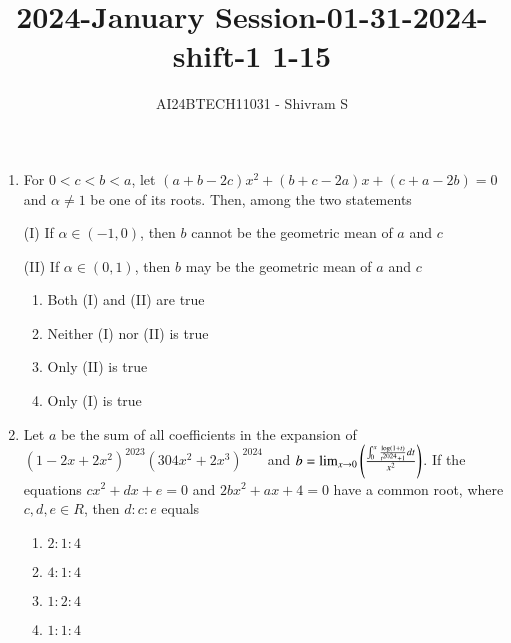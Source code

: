 \documentclass[journal]{IEEEtran}
\begin{document}

\onecolumn

\title{2024-January Session-01-31-2024-shift-1 1-15}
\author{AI24BTECH11031 - Shivram S}
\maketitle
\bigskip

\renewcommand{\thefigure}{\theenumi}
\renewcommand{\thetable}{\theenumi}

\begin{enumerate}


    
    \item For $0 < c < b < a$, let $(a + b - 2c)x^2 + (b + c - 2a)x
    + (c + a - 2b) = 0$ and $\alpha \ne 1$ be one of its roots.
    Then, among the two statements
    
    (I) If $\alpha \in (-1, 0)$, then $b$ cannot be the geometric
    mean of $a$ and $c$
    
    (II) If $\alpha \in (0, 1)$, then $b$ may be the geometric
    mean of $a$ and $c$

    \begin{multicols}{2}
\begin{enumerate}

        \item Both (I) and (II) are true
        \item Neither (I) nor (II) is true
        \item Only (II) is true
        \item Only (I) is true
    \end{enumerate}
\end{multicols}

    \item Let $a$ be the sum of all coefficients in the
    expansion of $(1 - 2x + 2x^2)^{2023} (3 0 4x^2+2x^3)^{2024}$
    and $b = \lim_{x \to 0} \left(\frac{\int_0^x \frac{\log(1+t)}{t^{2024} + 1} dt} {x^2}\right)$.
    If the equations $cx^2 + dx + e = 0$ and $2bx^2 + ax + 4 = 0$
    have a common root, where $c, d, e \in R$, then $d : c : e$ equals
    
    \begin{multicols}{4}
\begin{enumerate}

        \item $2:1:4$
        \item $4:1:4$
        \item $1:2:4$
        \item $1:1:4$
    \end{enumerate}
\end{multicols}


\end{enumerate}
\end{document}
